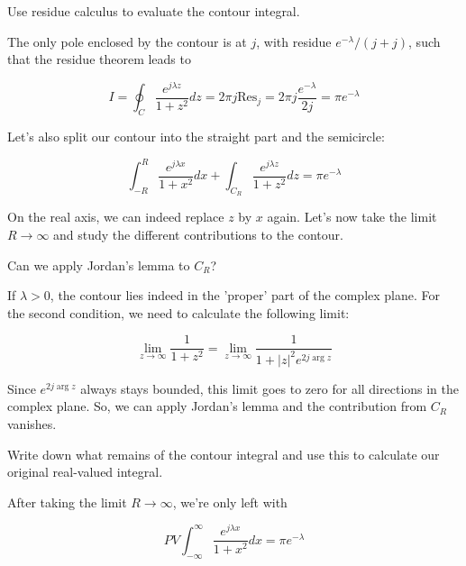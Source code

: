 \begin{cue}
Use residue calculus to evaluate the contour integral.
\end{cue}

The only pole enclosed by the contour is at $j$, with residue $e^{-\lambda}/(j+j)$, such that the residue theorem leads to 

\begin{equation}
  I = \oint_{{C}} \frac{e^{j \lambda z}}{1 + z^2} dz = 2 \pi j \mathrm{Res}_{j} =  2 \pi j \frac{e^{-\lambda}}{2j} = \pi e^{-\lambda}
\end{equation}

Let's also split our contour into the straight part and the semicircle:

\begin{equation}
\int_{-R}^{R} \frac{e^{j \lambda x}}{1 + x^2} dx + \int_{{C_R}}
\frac{e^{j \lambda z}}{1 + z^2} dz = \pi
e^{-\lambda}
\end{equation}

On the real axis, we can indeed replace $z$ by $x$ again. Let's now take the limit $R \to \infty$ and study the different contributions to the contour.

\begin{cue}
Can we apply Jordan's lemma to ${C_R}$? 
\end{cue}

\noindent{}If $\lambda > 0$, the contour lies indeed in the 'proper' part of the complex plane. For the second condition, we need to calculate the following limit:

\begin{equation}
\lim_{z \to \infty}\frac{1}{1+z^2} = \lim_{z \to \infty}\frac{1}{1+|z|^2 e^{2 j
\arg z}}
\end{equation}

Since $e^{2 j \arg z}$ always stays bounded, this limit goes to zero for all directions in the complex plane. So, we can apply Jordan's lemma and the contribution from ${C_R}$ vanishes.

\begin{cue}
Write down what remains of the contour integral and use this to calculate our original real-valued integral.
\end{cue}

After taking the limit $R \to \infty$, we're only left with

\begin{equation}
PV \int_{-\infty}^{\infty}\frac{e^{j \lambda x}}{1 + x^2} dx = \pi e^{-\lambda}
\end{equation}


